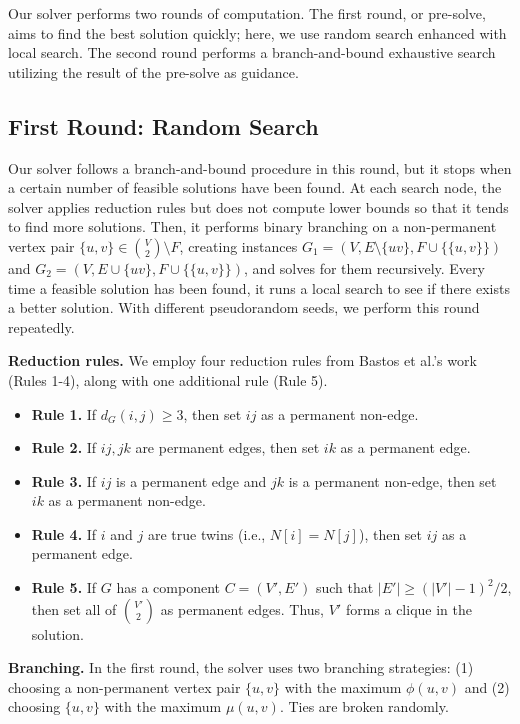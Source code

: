\documentclass[a4paper,UKenglish,cleveref, autoref, thm-restate]{lipics-v2021}
\begin{document}
Our solver performs two rounds of computation. The first round, or pre-solve, aims to find the best solution quickly; here, we use random search enhanced with local search. The second round performs a branch-and-bound exhaustive search utilizing the result of the pre-solve as guidance.

\subsection{First Round: Random Search}

Our solver follows a branch-and-bound procedure in this round, but it stops when a certain number of feasible solutions have been found. At each search node, the solver applies reduction rules but does not compute lower bounds so that it tends to find more solutions. Then, it performs binary branching on a non-permanent vertex pair $\{u,v\} \in \binom{V}{2} \setminus F$, creating instances $G_1=(V,E \setminus \{uv\}, F \cup \{\{u,v\}\})$ and $G_2 = (V,E \cup \{uv\}, F \cup \{\{u,v\}\})$, and solves for them recursively. Every time a feasible solution has been found, it runs a local search to see if there exists a better solution. With different pseudorandom seeds, we perform this round repeatedly.

\textbf{Reduction rules.} We employ four reduction rules from Bastos et al.'s work \cite{bastos2016efficient} (Rules 1-4), along with one additional rule (Rule 5).

\begin{itemize}
    \item \textbf{Rule 1.} If $d_G(i,j) \geq 3$, then set $ij$ as a permanent non-edge.
    \item \textbf{Rule 2.} If $ij, jk$ are permanent edges, then set $ik$ as a permanent edge.
    \item \textbf{Rule 3.} If $ij$ is a permanent edge and $jk$ is a permanent non-edge, then set $ik$ as a permanent non-edge.
    \item \textbf{Rule 4.} If $i$ and $j$ are true twins (i.e., $N[i]=N[j]$), then set $ij$ as a permanent edge.
    \item \textbf{Rule 5.} If $G$ has a component $C=(V', E')$ such that $|E'| \geq (|V'| - 1)^2 / 2$, then set all of $\binom{V'}{2}$ as permanent edges. Thus, $V'$ forms a clique in the solution.
\end{itemize}

\textbf{Branching.} In the first round, the solver uses two branching strategies: (1) choosing a non-permanent vertex pair $\{u,v\}$ with the maximum $\phi(u,v)$ and (2) choosing $\{u,v\}$ with the maximum $\mu(u,v)$. Ties are broken randomly.
\end{document}
